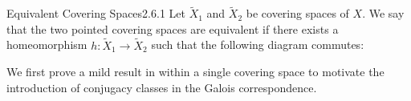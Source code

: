 \documentclass[a4paper]{article}
\begin{document}
\begin{defn}{Equivalent Covering Spaces}{2.6.1} Let $\widetilde{X}_1$ and $\widetilde{X}_2$ be covering spaces of $X$. We say that the two pointed covering spaces are equivalent if there exists a homeomorphism $h:\widetilde{X}_1\to\widetilde{X}_2$ such that the following diagram commutes: \\
\end{defn}

We first prove a mild result in within a single covering space to motivate the introduction of conjugacy classes in the Galois correspondence. 
\end{document}
